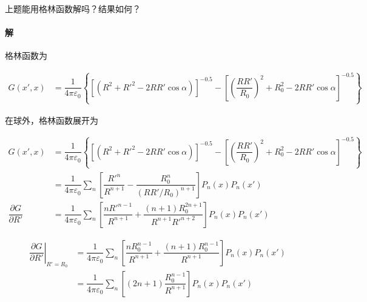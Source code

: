 \documentclass{article}
\begin{document}
上题能用格林函数解吗？结果如何？

\paragraph{解}

格林函数为

\begin{equation*}
  \begin{aligned}
    G \left( x', x \right) &= 
      \dfrac{1}{4\pi \varepsilon_0} \left\{ \left[ \left( R^2 + R'^2 - 2 R R' \cos \alpha \right) \right]^{-0.5} -
      \left[ \left( \dfrac{R R'}{R_0}  \right)^2 + R_0^2 - 2 RR' \cos \alpha \right]^{-0.5}
    \right\}
  \end{aligned}
\end{equation*}

在球外，格林函数展开为

\begin{equation*}
  \begin{aligned}
    G \left( x', x \right) &= 
      \dfrac{1}{4\pi \varepsilon_0} \left\{ \left[ \left( R^2 + R'^2 - 2 R R' \cos \alpha \right) \right]^{-0.5} -
      \left[ \left( \dfrac{R R'}{R_0}  \right)^2 + R_0^2 - 2 RR' \cos \alpha \right]^{-0.5}
    \right\} \\
    &= \dfrac{1}{4\pi \varepsilon_0} \sum_n \left[ \dfrac{R'^n}{R^{n+1}} - \dfrac{R_0^n}{\left( RR'/R_0 \right)^{n+1}}   \right] P_n \left( x \right) P_n \left( x' \right) \\
    \dfrac{\partial G}{\partial R'} &=
    \dfrac{1}{4\pi \varepsilon_0} \sum_n \left[ \dfrac{n R'^{n-1}}{R^{n+1}}  + \dfrac{\left( n+1 \right) R_0^{2n+1}}{R^{n+1} R'^{n+2}}  \right] P_n \left( x \right) P_n \left( x' \right)
  \end{aligned}
\end{equation*}

\begin{equation*}
  \begin{aligned}
    \left. \dfrac{\partial G}{\partial R'} \right|_{R'=R_0} &=
    \dfrac{1}{4\pi \varepsilon_0} \sum_n \left[ \dfrac{n R_0^{n-1}}{R^{n+1}} + \dfrac{ \left( n+1 \right) R_0^{n-1}}{R^{n+1}} \right] P_n \left( x \right) P_n \left( x' \right) \\
    &= \dfrac{1}{4\pi \varepsilon_0} \sum_n \left[ \left( 2n+1 \right) \dfrac{R_0^{n-1} }{R^{n+1}} \right] P_n \left( x \right) P_n \left( x' \right)
  \end{aligned}
\end{equation*}
\end{document}
